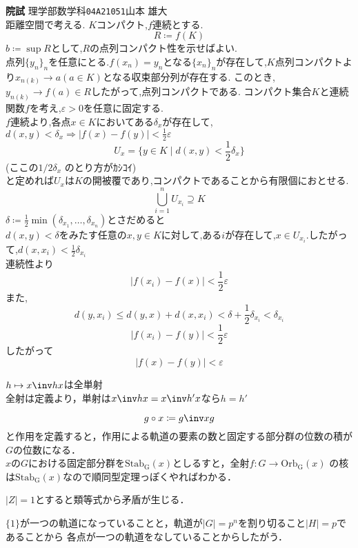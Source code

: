 \documentclass[leqno]{ltjsarticle}%
\begin{document}
{\textbf{\Large{院試}}}\hspace{\fill} {理学部数学科\texttt{\Large{04A21051}}}{\Large{山本 雄大}}\\
距離空間で考える.
$K$コンパクト,$f$連続とする.
\[R \coloneq f(K)\]
$b\coloneq \sup R$として,$R$の点列コンパクト性を示せばよい. \\
点列$\{y_n\}_n$を任意にとる.$f(x_n)=y_n$となる$\{x_n\}_n$が存在して,$K$点列コンパクトより$x_{n(k)}\to a (a\in K)$となる収束部分列が存在する.
このとき,$y_{n(k)}\to f(a) \in R$したがって,点列コンパクトである.
コンパクト集合$K$と連続関数$f$を考え,$\varepsilon > 0$を任意に固定する.\\
$f$連続より,各点$x\in K$においてある$\delta_{x}$が存在して,$d(x,y) < \delta_{x} \Longrightarrow |f(x) - f(y) | < \frac12\varepsilon $\\
\[U_x = \{y \in K \mid d(x,y) < \frac12 \delta_x\}\] 
(ここの$1/2 \delta_x$ のとり方がｶｼｺｲ)\\
と定めれば$U_x$は$K$の開被覆であり,コンパクトであることから有限個におとせる.
\[\bigcup_{i=1}^n U_{x_i} \supseteq K\]
$\delta \coloneq \frac12 \min(\delta_{x_1},\ldots , \delta_{x_n})$とさだめると\\
$d(x,y)< \delta$をみたす任意の$x,y \in K $に対して,ある$i$が存在して,$x\in U_{x_i}$.したがって,$d(x,x_i) < \frac12 \delta_{x_i}$\\
連続性より
\[|f(x_i) - f(x) |< \frac12 \varepsilon\]
また,
\[d(y,x_i) \leq d(y,x) + d(x,x_i) < \delta + \frac12 \delta_{x_i} < \delta_{x_i}\]
\[|f(x_i) - f(y)| < \frac12 \varepsilon\]
したがって
\[|f(x) - f(y)|<\varepsilon \]

$h\mapsto x\inv hx$は全単射\\
全射は定義より，単射は$x\inv hx = x\inv h'x$なら$h=h'$





\[g\circ x \coloneq g\inv xg\]
と作用を定義すると，作用による軌道の要素の数と固定する部分群の位数の積が$G$の位数になる．\\
$x$の$G$における固定部分群を$\mathrm{Stab_G}(x)$としるすと，全射$f\colon G \to \mathrm{Orb_G}(x)$
の核は$\mathrm{Stab_G}(x)$なので順同型定理っぽくやればわかる．

$|Z|=1$とすると類等式から矛盾が生じる．

$\{1\}$が一つの軌道になっていることと，軌道が$|G|=p^n$を割り切ること$|H|=p$であることから
各点が一つの軌道をなしていることからしたがう．
\end{document}
